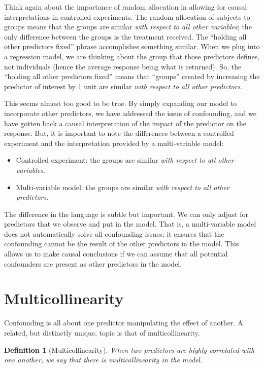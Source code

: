 \documentclass[
]{book}
\providecommand{\tightlist}{%
  \setlength{\itemsep}{0pt}\setlength{\parskip}{0pt}}
\theoremstyle{plain}
\theoremstyle{mydefn}
\newtheorem{definition}{Definition}[chapter]
\theoremstyle{myexmpl}
\theoremstyle{remark}
\begin{document}
Think again about the importance of random allocation in allowing for causal interpretations in controlled experiments. The random allocation of subjects to groups means that the groups are similar \emph{with respect to all other variables}; the only difference between the groups is the treatment received. The ``holding all other predictors fixed'' phrase accomplishes something similar. When we plug into a regression model, we are thinking about the group that those predictors defines, not individuals (hence the average response being what is returned). So, the ``holding all other predictors fixed'' means that ``groups'' created by increasing the predictor of interest by 1 unit are similar \emph{with respect to all other predictors}.

This seems almost too good to be true. By simply expanding our model to incorporate other predictors, we have addressed the issue of confounding, and we have gotten back a causal interpretation of the impact of the predictor on the response. But, it is important to note the differences between a controlled experiment and the interpretation provided by a multi-variable model:

\begin{itemize}
\tightlist
\item
  Controlled experiment: the groups are similar \emph{with respect to all other variables}.
\item
  Multi-variable model: the groups are similar \emph{with respect to all other predictors}.
\end{itemize}

The difference in the language is subtle but important. We can only adjust for predictors that we observe and put in the model. That is, a multi-variable model does not automatically solve all confounding issues; it ensures that the confounding cannot be the result of the other predictors in the model. This allows us to make causal conclusions if we can assume that all potential confounders are present as other predictors in the model.

\hypertarget{multicollinearity}{%
\section{Multicollinearity}\label{multicollinearity}}

Confounding is all about one predictor manipulating the effect of another. A related, but distinctly unique, topic is that of multicollinearity.

\begin{definition}[Multicollinearity]
When two predictors are highly correlated with one another, we say that there is multicollinearity in the model.
\end{definition}
\end{document}

